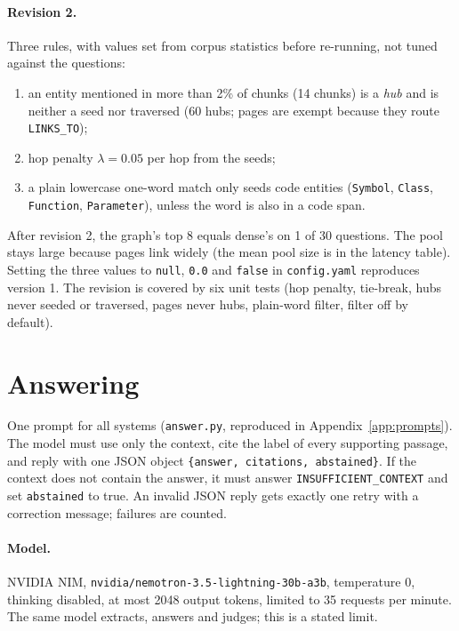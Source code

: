 \documentclass[11pt,a4paper]{article}
\newcommand{\code}[1]{\texttt{#1}}
\begin{document}
\paragraph{Revision 2.} Three rules, with values set from corpus statistics before re-running,
not tuned against the questions:
\begin{enumerate}[label=(\alph*)]
  \item an entity mentioned in more than 2\% of chunks (14 chunks) is a \emph{hub} and is neither
  a seed nor traversed (60 hubs; pages are exempt because they route \code{LINKS\_TO});
  \item hop penalty $\lambda = 0.05$ per hop from the seeds;
  \item a plain lowercase one-word match only seeds code entities (\code{Symbol}, \code{Class},
  \code{Function}, \code{Parameter}), unless the word is also in a code span.
\end{enumerate}
After revision 2, the graph's top 8 equals dense's on 1 of 30 questions. The pool stays large
because pages link widely (the mean pool size is in the latency table). Setting the three values
to \code{null}, \code{0.0} and \code{false} in \code{config.yaml} reproduces version 1. The
revision is covered by six unit tests (hop penalty, tie-break, hubs never seeded or traversed,
pages never hubs, plain-word filter, filter off by default).

\section{Answering}

One prompt for all systems (\code{answer.py}, reproduced in Appendix~\ref{app:prompts}). The model
must use only the context, cite the label of every supporting passage, and reply with one JSON
object \code{\{answer, citations, abstained\}}. If the context does not contain the answer, it must
answer \code{INSUFFICIENT\_CONTEXT} and set \code{abstained} to true. An invalid JSON reply gets
exactly one retry with a correction message; failures are counted.

\paragraph{Model.} NVIDIA NIM, \code{nvidia/nemotron-3.5-lightning-30b-a3b}, temperature 0,
thinking disabled, at most 2048 output tokens, limited to 35 requests per minute. The same model
extracts, answers and judges; this is a stated limit.
\end{document}
